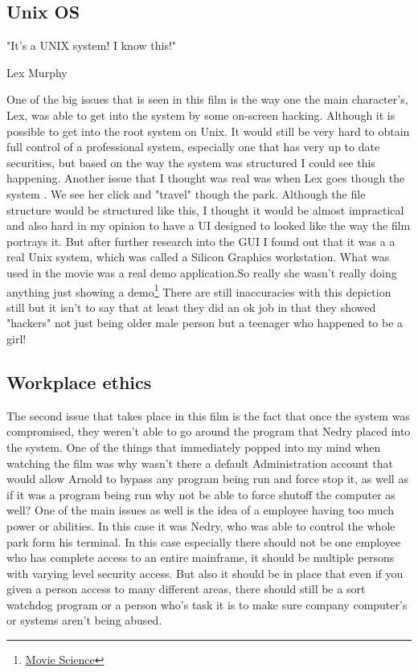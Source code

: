 \documentclass[12ptletterpaper]{paper}
\newcommand\tab[1][1cm]{\hspace*{#1}}
\begin{document}
\begin{flushleft}
		\subsection{Unix OS}
		\epigraph{"It's a UNIX system! I know this!"}{Lex Murphy}
		\tab One of the big issues that is seen in this film is the way one the main character's, Lex, was able to get into the system by some on-screen hacking. Although it is possible to get into the root system on Unix. It would still be very hard to obtain full control of a professional system, especially one that has very up to date securities, but based on the way the system was structured I could see this happening.  Another issue that I thought was real was when Lex goes though the system . We see her click and "travel" though the park. Although the file structure would be structured like this, I thought it would be almost impractical and also hard in my opinion to have a UI designed to looked like the way the film portrays it. But after further research into the GUI I found out that it was a a real Unix system, which was called a Silicon Graphics workstation. What was used in the movie was a real demo application.So really she wasn't really doing anything just showing a demo\footnote[9]{\hyperlink{Movie Science}{Movie Science}} There are still inaccuracies with this depiction still but it isn't to say that at least they did an ok job in that they showed "hackers" not just being older male person but a teenager who happened to be a girl!
		\subsection{Workplace ethics}
		\tab The second issue that takes place in this film is the fact that once the system was compromised, they weren't able to go around the program that Nedry placed into the system. One of the things that immediately popped into my mind when watching the film was why wasn't there a default Administration account that would allow Arnold to bypass any program being run and force stop it, as well as if it was a program being run why not be able to force shutoff the computer as well? One of the main issues as well is the idea of a employee having too much power or abilities. In this case it was Nedry, who was able to control the whole park form his terminal. In this case especially there should not be one employee who has complete access to an entire mainframe, it should be multiple persons with varying level security access. But also it should be in place that even if you given a person access to many different areas, there should still be a sort watchdog program or a person who's task it is to make sure company computer's or systems aren't being abused.
		

\end{flushleft}
\end{document}

